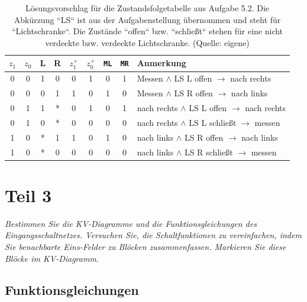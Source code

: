 \begin{table}[h!]
    \centering
    \setlength{\tabcolsep}{0.5em}
    \def\arraystretch{1.5}
    \begin{tabular}{|c|c|c|c||c|c||c|c||l|}
        \hline
        \textbf{$z_1$} & \textbf{$z_0$} & \textbf{L} & \textbf{R} & \textbf{$z_1^+$} & \textbf{$z_0^+$} & \texttt{ML} & \texttt{MR} & Anmerkung \\
        \hline
        \hline
        0 & 0 & 1 & 0 & 0 & 1 & 0 & 1 & Messen $\land$ LS L offen $\rightarrow$ nach rechts\\ \hline
        0 & 0 & 0 & 1 & 1 & 0 & 1 & 0 & Messen $\land$ LS R offen $\rightarrow$ nach links \\ \hline
        \hline
        0 & 1 & 1 & * & 0 & 1 & 0 & 1 & nach rechts $\land$ LS L offen $\rightarrow$ nach rechts \\ \hline
        0 & 1 & 0 & * & 0 & 0 & 0 & 0 & nach rechts $\land$ LS L schließt $\rightarrow$ messen \\ \hline
        \hline
        1 & 0 & * & 1 & 1 & 0 & 1 & 0 &  nach links $\land$ LS R offen $\rightarrow$ nach links \\ \hline
        1 & 0 & * & 0 & 0 & 0 & 0 & 0 &  nach links $\land$ LS R schließt $\rightarrow$ messen \\
        \hline
    \end{tabular}
    \caption{Lösungsvorschlag für die Zustandsfolgetabelle aus Aufgabe 5.2. Die Abkürzung ``LS`` ist aus der Aufgabenstellung übernommen und steht für ``Lichtschranke``. Die Zustände ``offen`` bzw. ``schließt`` stehen für eine nicht verdeckte bzw. verdeckte Lichtschranke. (Quelle: eigene)}
    \label{tab:zustandsfolgetabelle}
\end{table}

\section{Teil 3}

\textit{Bestimmen Sie die KV-Diagramme und die Funktionsgleichungen des
Eingangsschaltnetzes.
Versuchen Sie, die Schaltfunktionen zu vereinfachen, indem Sie benachbarte Eins-Felder zu Blöcken zusammenfassen. Markieren Sie diese
Blöcke im KV-Diagramm.}\\

\noindent
\subsection*{Funktionsgleichungen}

